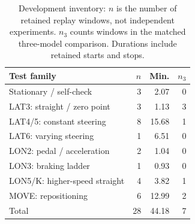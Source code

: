 \begin{table}[t]
\centering\small
\setlength{\tabcolsep}{3pt}
\begin{tabular}{@{}lrrr@{}}
\toprule
Test family & $n$ & Min. & $n_{3}$ \\
\midrule
Stationary / self-check & 3 & 2.07 & 0 \\
LAT3: straight / zero point & 3 & 1.13 & 3 \\
LAT4/5: constant steering & 8 & 15.68 & 1 \\
LAT6: varying steering & 1 & 6.51 & 0 \\
LON2: pedal / acceleration & 2 & 1.04 & 0 \\
LON3: braking ladder & 1 & 0.93 & 0 \\
LON5/K: higher-speed straight & 4 & 3.82 & 1 \\
MOVE: repositioning & 6 & 12.99 & 2 \\
\midrule
Total & 28 & 44.18 & 7 \\
\bottomrule
\end{tabular}
\caption{Development inventory: $n$ is the number of retained replay windows, not independent experiments. $n_3$ counts windows in the matched three-model comparison. Durations include retained starts and stops.}
\label{tab:exp_inventory}
\end{table}
